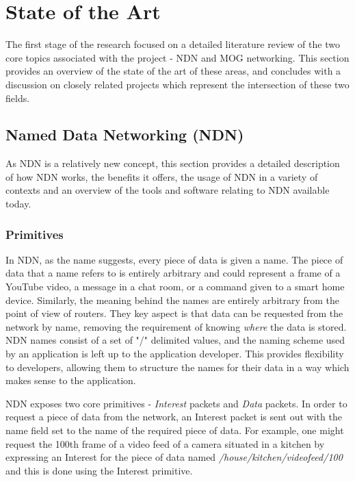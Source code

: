 \chapter{State of the Art}
The first stage of the research focused on a detailed literature review of the two core topics associated with the project - NDN and MOG networking. This section provides an overview of the state of the art of these areas, and concludes with a discussion on closely related projects which represent the intersection of these two fields. 

\section{Named Data Networking (NDN)}\label{sec:ndn-sota}
As NDN is a relatively new concept, this section provides a detailed description of how NDN works, the benefits it offers, the usage of NDN in a variety of contexts and an overview of the tools and software relating to NDN available today. 

\subsection{Primitives}
In NDN, as the name suggests, every piece of data is given a name. The piece of data that a name refers to is entirely arbitrary and could represent a frame of a YouTube video, a message in a chat room, or a command given to a smart home device. Similarly, the meaning behind the names are entirely arbitrary from the point of view of routers. They key aspect is that data can be requested from the network by name, removing the requirement of knowing \textit{where} the data is stored. NDN names consist of a set of "/" delimited values, and the naming scheme used by an application is left up to the application developer. This provides flexibility to developers, allowing them to structure the names for their data in a way which makes sense to the application.

NDN exposes two core primitives - \textit{Interest} packets and \textit{Data} packets. In order to request a piece of data from the network, an Interest packet is sent out with the name field set to the name of the required piece of data. For example, one might request the 100th frame of a video feed of a camera situated in a kitchen by expressing an Interest for the piece of data named \textit{/house/kitchen/videofeed/100} and this is done using the Interest primitive.

